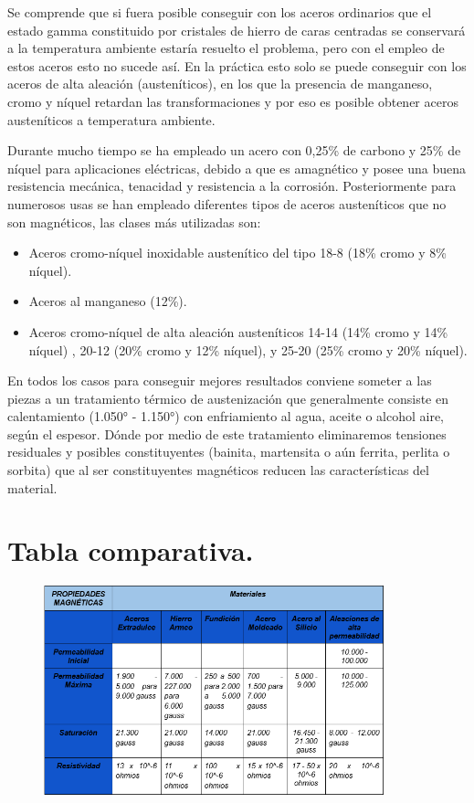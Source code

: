 \documentclass[12pt,a4paper]{article}
\begin{document}
Se comprende que si fuera posible conseguir con los aceros ordinarios que el estado gamma constituido por cristales de hierro de caras centradas se conservará a la temperatura ambiente estaría resuelto el problema, pero con el empleo de estos aceros esto no sucede así. En la práctica esto solo se puede conseguir con los aceros de alta aleación (austeníticos), en los que la presencia de manganeso, cromo y níquel retardan las transformaciones y por eso es posible obtener aceros austeníticos a temperatura ambiente.

Durante mucho tiempo se ha empleado un acero con 0,25\% de carbono y 25\% de níquel para aplicaciones eléctricas, debido a que es amagnético y posee una buena resistencia mecánica, tenacidad y resistencia a la corrosión. Posteriormente para numerosos usas se han empleado diferentes tipos de aceros austeníticos que no son magnéticos, las clases más utilizadas son: 

\begin{itemize}
    \item Aceros cromo-níquel inoxidable austenítico del tipo 18-8 (18\% cromo y 8\% níquel).
    \item Aceros al manganeso (12\%).
    \item Aceros cromo-níquel de alta aleación austeníticos 14-14 (14\% cromo y 14\% níquel) , 20-12 (20\% cromo y 12\% níquel), y 25-20 (25\% cromo y 20\% níquel).
\end{itemize}

En todos los casos para conseguir mejores resultados conviene someter a las piezas a un tratamiento térmico de austenización que generalmente consiste en calentamiento (1.050° - 1.150°) con enfriamiento al agua, aceite o alcohol aire, según el espesor. Dónde por medio de este tratamiento eliminaremos tensiones residuales y posibles constituyentes (bainita, martensita o aún ferrita, perlita o sorbita) que al ser constituyentes magnéticos reducen las características del material.

\section{Tabla comparativa.}



\begin{figure}[H]    
    \centering         
    \includegraphics[width=0.88\textwidth]{IMAGENES LATEX/11.png}
\end{figure}
\end{document}
